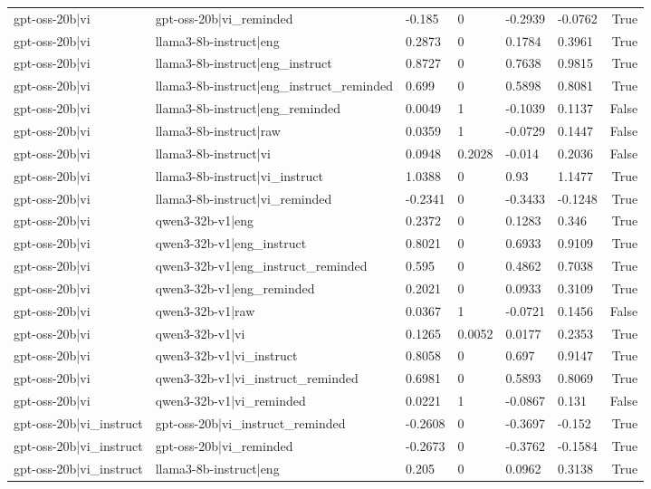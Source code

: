 \begin{table}
\begin{tabular}{llllllr}
gpt-oss-20b|vi & gpt-oss-20b|vi_reminded & -0.185 & 0 & -0.2939 & -0.0762 & True \\
gpt-oss-20b|vi & llama3-8b-instruct|eng & 0.2873 & 0 & 0.1784 & 0.3961 & True \\
gpt-oss-20b|vi & llama3-8b-instruct|eng_instruct & 0.8727 & 0 & 0.7638 & 0.9815 & True \\
gpt-oss-20b|vi & llama3-8b-instruct|eng_instruct_reminded & 0.699 & 0 & 0.5898 & 0.8081 & True \\
gpt-oss-20b|vi & llama3-8b-instruct|eng_reminded & 0.0049 & 1 & -0.1039 & 0.1137 & False \\
gpt-oss-20b|vi & llama3-8b-instruct|raw & 0.0359 & 1 & -0.0729 & 0.1447 & False \\
gpt-oss-20b|vi & llama3-8b-instruct|vi & 0.0948 & 0.2028 & -0.014 & 0.2036 & False \\
gpt-oss-20b|vi & llama3-8b-instruct|vi_instruct & 1.0388 & 0 & 0.93 & 1.1477 & True \\
gpt-oss-20b|vi & llama3-8b-instruct|vi_reminded & -0.2341 & 0 & -0.3433 & -0.1248 & True \\
gpt-oss-20b|vi & qwen3-32b-v1|eng & 0.2372 & 0 & 0.1283 & 0.346 & True \\
gpt-oss-20b|vi & qwen3-32b-v1|eng_instruct & 0.8021 & 0 & 0.6933 & 0.9109 & True \\
gpt-oss-20b|vi & qwen3-32b-v1|eng_instruct_reminded & 0.595 & 0 & 0.4862 & 0.7038 & True \\
gpt-oss-20b|vi & qwen3-32b-v1|eng_reminded & 0.2021 & 0 & 0.0933 & 0.3109 & True \\
gpt-oss-20b|vi & qwen3-32b-v1|raw & 0.0367 & 1 & -0.0721 & 0.1456 & False \\
gpt-oss-20b|vi & qwen3-32b-v1|vi & 0.1265 & 0.0052 & 0.0177 & 0.2353 & True \\
gpt-oss-20b|vi & qwen3-32b-v1|vi_instruct & 0.8058 & 0 & 0.697 & 0.9147 & True \\
gpt-oss-20b|vi & qwen3-32b-v1|vi_instruct_reminded & 0.6981 & 0 & 0.5893 & 0.8069 & True \\
gpt-oss-20b|vi & qwen3-32b-v1|vi_reminded & 0.0221 & 1 & -0.0867 & 0.131 & False \\
gpt-oss-20b|vi_instruct & gpt-oss-20b|vi_instruct_reminded & -0.2608 & 0 & -0.3697 & -0.152 & True \\
gpt-oss-20b|vi_instruct & gpt-oss-20b|vi_reminded & -0.2673 & 0 & -0.3762 & -0.1584 & True \\
gpt-oss-20b|vi_instruct & llama3-8b-instruct|eng & 0.205 & 0 & 0.0962 & 0.3138 & True \\

\end{tabular}
\end{table}
